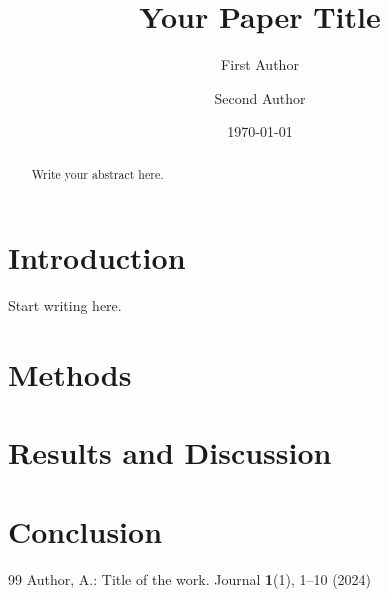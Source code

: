 \documentclass[11pt]{article}
\title{Your Paper Title}
\author{First Author \and Second Author}
\date{\today}
\begin{document}
\maketitle

\begin{abstract}
Write your abstract here.
\end{abstract}

\section{Introduction}
Start writing here.

\section{Methods}

\section{Results and Discussion}

\section{Conclusion}

\begin{thebibliography}{99}
 Author, A.: Title of the work. Journal \textbf{1}(1), 1--10 (2024)
\end{thebibliography}
\end{document}
